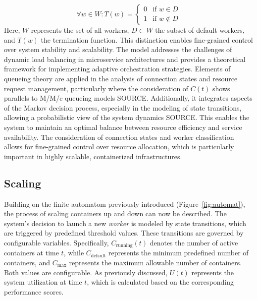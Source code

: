 \documentclass[twocolumn]{webofc}
\begin{document}
$$ \forall w \in W: T(w) = \begin{cases} 
0 & \text{if } w \in D \\
1 & \text{if } w \notin D
\end{cases} $$
Here, $W$ represents the set of all workers, $D \subset W$ the subset of default workers, and $T(w)$ the termination function. This distinction enables fine-grained control over system stability and scalability. The model addresses the challenges of dynamic load balancing in microservice architectures and provides a theoretical framework for implementing adaptive orchestration strategies. Elements of queueing theory are applied in the analysis of connection states and resource request management, particularly where the consideration of $C(t)$ shows parallels to M/M/c queueing models {\color{red} SOURCE}. Additionally, it integrates aspects of the Markov decision process, especially in the modeling of state transitions, allowing a probabilistic view of the system dynamics {\color{red} SOURCE}. This enables the system to maintain an optimal balance between resource efficiency and service availability. The consideration of connection states and worker classification allows for fine-grained control over resource allocation, which is particularly important in highly scalable, containerized infrastructures.

\subsection{Scaling}  
Building on the finite automatom previously introduced (Figure~\ref{fig:automat}), the process of scaling containers up and down can now be described. The system’s decision to launch a new \textit{worker} is modeled by state transitions, which are triggered by predefined threshold values. These transitions are governed by configurable variables. Specifically, \( C_{\text{running}}(t) \) denotes the number of active containers at time \( t \), while \( C_{\text{default}} \) represents the minimum predefined number of containers, and \( C_{\text{max}} \) represents the maximum allowable number of containers. Both values are configurable. As previously discussed, \( U(t) \) represents the system utilization at time \( t \), which is calculated based on the corresponding performance scores.
\end{document}
